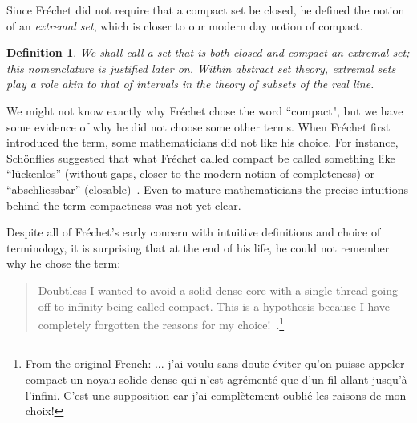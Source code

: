 \documentclass[12pt]{article}
\newtheorem{dfn}[thm]{Definition}
\begin{document}
Since Fr\'{e}chet did not require that a compact set be closed, he defined the notion of an {\it extremal set}, which is closer to our modern day notion of compact.

\begin{dfn}
We shall call a set that is both closed and compact an {\it extremal} set; this nomenclature is justified later on. Within abstract set theory, extremal sets play a role akin to that of intervals in the theory of subsets of the real line. 
\end{dfn}




We might not know exactly why Fr\'{e}chet chose the word ``compact", but we have some evidence of why he did not choose some other terms. When Fr\'{e}chet first introduced the term, some mathematicians did not like his choice. For instance, Sch\"{o}nflies suggested that what Fr\'{e}chet called compact be called something like ``l\"{u}ckenlos'' (without gaps, closer to the modern notion of completeness) or ``abschliessbar'' (closable)~\cite[p. 266]{tay1}. Even to mature mathematicians the precise intuitions behind the term compactness was not yet clear.

Despite all of Fr\'{e}chet's early concern with intuitive definitions and
choice of terminology, it is surprising that at the end of his life, he could not
remember why he chose the term:
 
\begin{quote}
Doubtless I wanted to avoid a solid dense core with a single thread going off to
infinity being called compact. This is a hypothesis because I have completely
forgotten the reasons for my choice!~\cite[p. 440]{pier}.\footnote{From the original French: ... j'ai voulu sans doute \'{e}viter qu'on puisse appeler compact un noyau solide dense qui n'est agr\'{e}ment\'{e} que d'un fil allant jusqu'\`{a} l'infini. C'est une supposition car j'ai compl\`{e}tement oubli\'{e} les raisons de mon choix!}
\end{quote}
\end{document}
